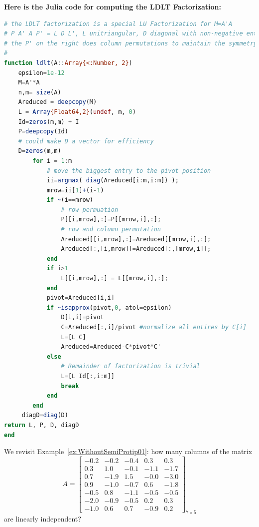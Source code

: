 \vspace*{.2cm}
\textbf{Here is the Julia code for computing the LDLT Factorization:}
\begin{lstlisting}[language=Julia,style=mystyle]
# the LDLT factorization is a special LU Factorization for M=A'A
# P A' A P' = L D L', L unitriangular, D diagonal with non-negative entries, P permutation matrix
# the P' on the right does column permutations to maintain the symmetry of A'*A
#
function ldlt(A::Array{<:Number, 2})
    epsilon=1e-12
    M=A'*A
    n,m= size(A)
    Areduced = deepcopy(M)
    L = Array{Float64,2}(undef, m, 0)
    Id=zeros(m,m) + I
    P=deepcopy(Id)
    # could make D a vector for efficiency
    D=zeros(m,m)
        for i = 1:m
            # move the biggest entry to the pivot position
            ii=argmax( diag(Areduced[i:m,i:m]) );
            mrow=ii[1]+(i-1) 
            if ~(i==mrow)
                # row permuation
                P[[i,mrow],:]=P[[mrow,i],:];  
                # row and column permutation
                Areduced[[i,mrow],:]=Areduced[[mrow,i],:];
                Areduced[:,[i,mrow]]=Areduced[:,[mrow,i]];
            end
            if i>1
                L[[i,mrow],:] = L[[mrow,i],:];             
            end
            pivot=Areduced[i,i]
            if ~isapprox(pivot,0, atol=epsilon)
                D[i,i]=pivot
                C=Areduced[:,i]/pivot #normalize all entires by C[i]
                L=[L C]
                Areduced=Areduced-C*pivot*C'   
            else
                # Remainder of factorization is trivial
                L=[L Id[:,i:m]]
                break
            end 
        end
     diagD=diag(D)
return L, P, D, diagD
end
\end{lstlisting}

\vspace*{.2cm}

\begin{example} 
\label{ex:SemiProtip01} We revisit Example~\ref{ex:WithoutSemiProtip01}: how many columns of the matrix 
\begin{equation}
\label{eq:WowCanWeAnalyzeThis00}
A=\left[
\begin{array}{rrrrr}
-0.2 & -0.2 & -0.4 & 0.3 & 0.3 \\
0.3 & 1.0 & -0.1 & -1.1 & -1.7 \\
0.7 & -1.9 & 1.5 & -0.0 & -3.0 \\
0.9 & -1.0 & -0.7 & 0.6 & -1.8 \\
-0.5 & 0.8 & -1.1 & -0.5 & -0.5 \\
-2.0 & -0.9 & -0.5 & 0.2 & 0.3 \\
-1.0 & 0.6 & 0.7 & -0.9 & 0.2
\end{array}
\right]_{7 \times 5}
\end{equation}
are linearly independent?
\end{example}

